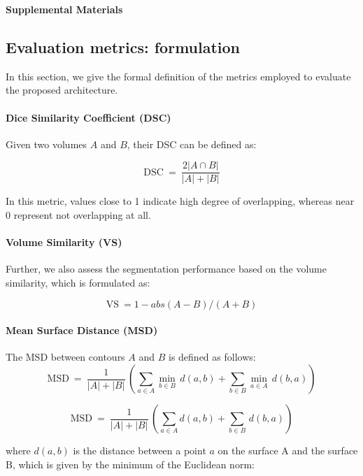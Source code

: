 \documentclass[journal]{IEEEtran}
\begin{document}
\setcounter{page}{1}
\begin{center}
\textbf{\large Supplemental Materials}
\end{center}

\subsection*{\textbf{Evaluation metrics: formulation}}

In this section, we give the formal definition of the metrics employed to evaluate the proposed architecture.
\paragraph{\textbf{Dice Similarity Coefficient (DSC)}}
Given two volumes $A$ and $B$, their DSC can be defined as:

\begin{equation}
	\mathrm{DSC} \ = \ \dfrac{2\left|A \cap B \right|}{|A|+|B|}
\end{equation}

In this metric, values close to 1 indicate high degree of overlapping, whereas near 0 represent not overlapping at all. 
\paragraph{\textbf{Volume Similarity (VS)}} Further, we also assess the segmentation performance based on the volume similarity, which is formulated as:

\begin{equation}
	\mathrm{VS} \ = 1 - abs(A - B) / (A + B)
\end{equation}

\paragraph{\textbf{Mean Surface Distance (MSD)}} The MSD between contours $A$ and $B$ is defined as follows:
\begin{equation}
\mathrm{MSD} \ = \ \dfrac{1}{|A| + |B|} \, \left(\sum_{a \in A} \min_{b \in B} \, d(a,b) + \sum_{b \in B} \min_{a \in A} \, d(b,a) \right)
\end{equation}

\begin{equation}
\mathrm{MSD} \ = \ \dfrac{1}{|A| + |B|} \, \left(\sum_{a \in A} d(a,b) + \sum_{b \in B}  \, d(b,a) \right)
\end{equation}

where $d(a,b)$ is the distance between a point $a$ on the surface A and the surface B, which is given by the minimum of the Euclidean norm:
\end{document}
